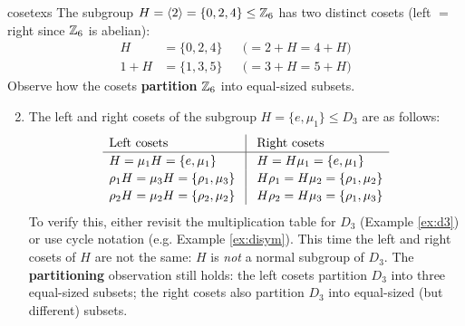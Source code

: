 \begin{examples}{}{cosetexs}
	\exstart\label{ex:cosets1} The subgroup $H=\left\langle 2\right\rangle=\{0,2,4\}\le\mathbb{Z}_6$ has two distinct cosets (left $=$ right since $\mathbb{Z}_6$ is abelian):
	\begin{align*}
		H&=\{0,2,4\}&&\bigl(=2+H=4+H\bigr)\\
		1+H&=\{1,3,5\}&&\bigl(=3+H=5+H\bigr)
	\end{align*}
	Observe how the cosets \textbf{partition} $\mathbb{Z}_6$ into equal-sized subsets.
	

	\begin{enumerate}\setcounter{enumi}{1}
		\item\label{ex:nonnormalcosets} The left and right cosets of the subgroup $H=\{e,\mu_1\}\le D_3$ are as follows:
		\[
			\renewcommand{\arraystretch}{1.15}
			\begin{array}{l@{\hspace*{.3cm}}|@{\hspace*{.3cm}}l}
		  	\text{Left cosets} & \text{Right cosets}\\\hline
				H=\mu_1H=\{e,\mu_1\}& H=H\mu_1=\{e,\mu_1\}\\
				\rho_1H=\mu_3H=\{\rho_1,\mu_3\} & H\rho_1=H\mu_2=\{\rho_1,\mu_2\}\\
				\rho_2H=\mu_2H=\{\rho_2,\mu_2\} & H\rho_2=H\mu_3=\{\rho_1,\mu_3\}
			\end{array}
		\]
		To verify this, either revisit the multiplication table for $D_3$ (Example \ref{ex:d3}) or use cycle notation (e.g. Example \ref{ex:disym}).	This time the left and right cosets of $H$ are not the same: $H$ is \emph{not} a normal subgroup of $D_3$. The \textbf{partitioning} observation still holds: the left cosets partition $D_3$ into three equal-sized subsets; the right cosets also partition $D_3$ into equal-sized (but different) subsets.
	

\end{enumerate}
\end{examples}
